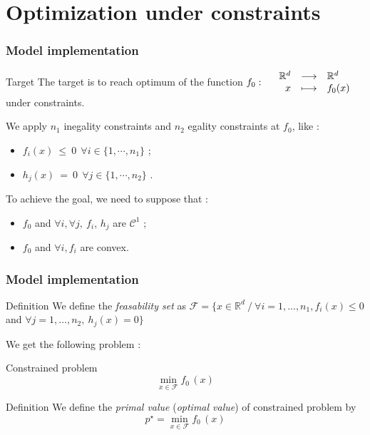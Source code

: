 \documentclass[unknownkeysallowed]{beamer}
\begin{document}
\section{Optimization under constraints}
\label{sec:conclusion}
\begin{frame}
\frametitle{Model implementation}
\begin{block}{Target}
The target is to reach optimum of the function $f_0 : \begin{array}{l rcl}
 & \mathbb{R}^d & \longrightarrow & \mathbb{R}^d \\
    & x & \longmapsto & f_0(x)
\end{array}$ under constraints.
\end{block}
\vspace{0.5cm}
We apply $n_1$ inegality constraints and $n_2$ egality constraints at $f_0$, like :
\begin{itemize}
    \item $f_i(x)\  \leq \  0 \  \ \forall i \in \{1, \cdots , n_1\}$ ;
    \item $h_j(x)\  = \  0 \  \ \forall j \in \{1, \cdots , n_2\}$ .
\end{itemize}
\vspace{0.25cm}
To achieve the goal, we need to suppose that :
\begin{itemize}
    \item $f_0$ and $\forall i, \forall j, \ f_i$, $h_j$ are $\mathcal{C}^1$ ;
    \item $f_0$ and $\forall i ,  f_i$ are convex.
\end{itemize}
\end{frame}

\begin{frame}
\frametitle{Model implementation}
\begin{block}{Definition}
We define the \textit{feasability set} as $\mathcal{F} = \{x \in \mathbb{R}^d \ / \  \forall i=1,\dots,n_1, f_i(x)\leq 0 $ and $\forall j=1,\dots,n_2, \ h_j(x)=0\}$
\end{block}
\vspace{0.3cm}
We get the following problem :
\begin{alertblock}{Constrained problem}
$$\min_{x \in \mathcal{F}} f_0\,(x)$$
\end{alertblock}
\vspace{0.3cm}
\begin{block}{Definition}
We define the \textit{primal value} (\textit{optimal value}) of constrained problem by $$p^{\star} = \min_{x \in \mathcal{F}} f_0\,(x)$$
\end{block}
\end{frame}
\end{document}
